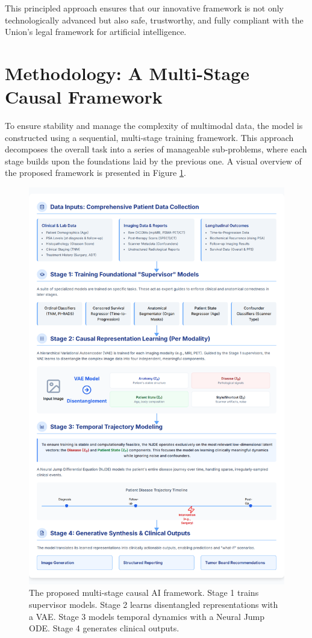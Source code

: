\documentclass[11pt, a4paper]{article}
\begin{document}
This principled approach ensures that our innovative framework is not only technologically advanced but also safe, trustworthy, and fully compliant with the Union's legal framework for artificial intelligence.

\section{Methodology: A Multi-Stage Causal Framework}
To ensure stability and manage the complexity of multimodal data, the model is constructed using a sequential, multi-stage training framework. This approach decomposes the overall task into a series of manageable sub-problems, where each stage builds upon the foundations laid by the previous one. A visual overview of the proposed framework is presented in Figure \ref{fig:ml_framework}.

\begin{figure}[H]
    \centering
    \includegraphics[width=\textwidth]{ml.png}
    \caption{The proposed multi-stage causal AI framework. Stage 1 trains supervisor models. Stage 2 learns disentangled representations with a VAE. Stage 3 models temporal dynamics with a Neural Jump ODE. Stage 4 generates clinical outputs.}
    \label{fig:ml_framework}
\end{figure}
\end{document}
